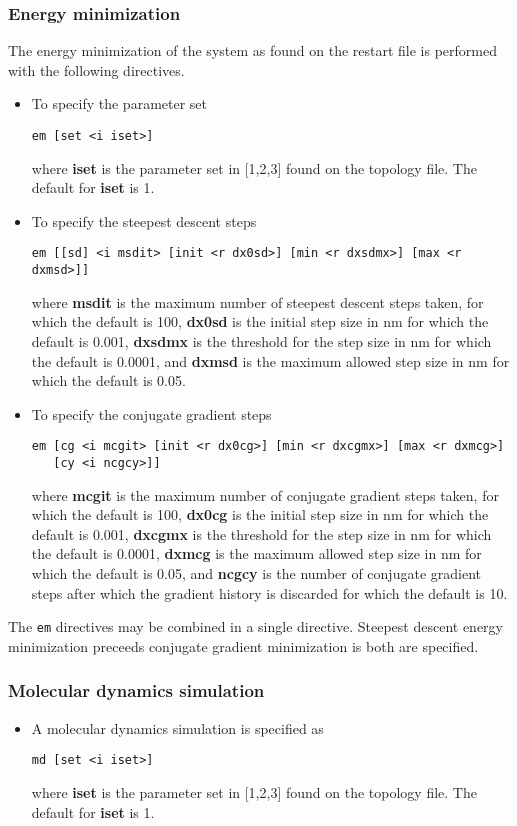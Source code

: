 \subsubsection{Energy minimization}
The energy minimization of the system as found on the restart file 
is performed with the following directives.
\begin{itemize}
\item
To specify the parameter set
\begin{verbatim}
em [set <i iset>] 
\end{verbatim}
where {\bf iset} is the parameter set in [1,2,3] found on the
topology file. The default for {\bf iset} is 1.
\item
To specify the steepest descent steps
\begin{verbatim}
em [[sd] <i msdit> [init <r dx0sd>] [min <r dxsdmx>] [max <r dxmsd>]] 
\end{verbatim}
where {\bf msdit} is the maximum number of steepest descent steps taken,
for which the default is 100, {\bf dx0sd} is the initial step size in nm
for which the default is 0.001, {\bf dxsdmx} is the threshold for the
step size in nm for which the default is 0.0001, and {\bf dxmsd} is the
maximum allowed step size in nm for which the default is 0.05.
\item
To specify the conjugate gradient steps
\begin{verbatim}
em [cg <i mcgit> [init <r dx0cg>] [min <r dxcgmx>] [max <r dxmcg>]
   [cy <i ncgcy>]]
\end{verbatim}
where {\bf mcgit} is the maximum number of conjugate gradient steps taken,
for which the default is 100, {\bf dx0cg} is the initial step size in nm
for which the default is 0.001, {\bf dxcgmx} is the threshold for the
step size in nm for which the default is 0.0001, {\bf dxmcg} is the
maximum allowed step size in nm for which the default is 0.05, and {\bf ncgcy}
is the number of conjugate gradient steps after which the gradient history
is discarded for which the default is 10.
\end{itemize}
The \verb+em+ directives may be combined in a single directive. Steepest
descent energy minimization preceeds conjugate gradient minimization is
both are specified.
\subsubsection{Molecular dynamics simulation}
\begin{itemize}
\item
A molecular dynamics simulation is specified as
\begin{verbatim}
md [set <i iset>]
\end{verbatim}
where {\bf iset} is the parameter set in [1,2,3] found on the
topology file. The default for {\bf iset} is 1.
\end{itemize}
